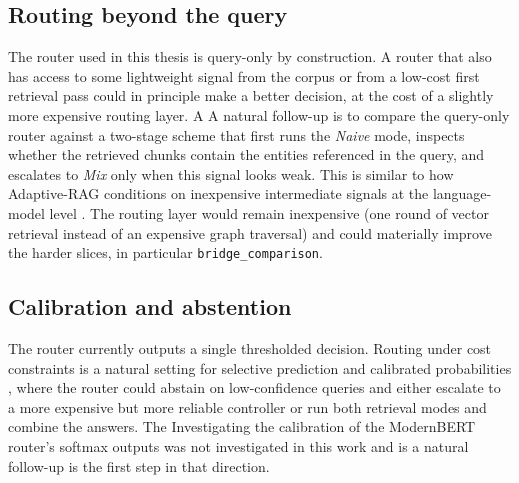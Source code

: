 \documentclass[english, bibtex]{kththesis}               %
\numberwithin{listing}{chapter}
\providecommand{\DIFaddtex}[1]{{\protect\color{blue} \sf #1}} %
\providecommand{\DIFdeltex}[1]{{\protect\color{red} \scriptsize #1}} %
\providecommand{\DIFaddbegin}{} %
\providecommand{\DIFaddend}{} %
\providecommand{\DIFdelbegin}{} %
\providecommand{\DIFdelend}{} %
\providecommand{\DIFadd}[1]{\texorpdfstring{\DIFaddtex{#1}}{#1}} %
\providecommand{\DIFdel}[1]{\texorpdfstring{\DIFdeltex{#1}}{}} %
\begin{document}
\subsection{Routing beyond the query} \DIFdelbegin %

\DIFdel{The router used in this thesis is query-only by construction. A router that also has access to some lightweight signal from the corpus or from a low-cost first retrieval pass could in principle make a better decision, at the cost of a slightly more expensive routing layer. A }\DIFdelend \DIFaddbegin \DIFadd{A }\DIFaddend natural follow-up is to compare the query-only router against a two-stage scheme that first runs the \emph{Naive} mode, inspects whether the retrieved chunks contain the entities referenced in the query, and escalates to \emph{Mix} only when this signal looks weak. This is similar to how Adaptive-RAG conditions on inexpensive intermediate signals at the language-model level \cite{jeong2024adaptiverag}. The routing layer would remain inexpensive (one round of vector retrieval instead of an expensive graph traversal) and could materially improve the harder slices, in particular \texttt{bridge\_comparison}.

\subsection{Calibration and abstention} \DIFdelbegin %

\DIFdel{The router currently outputs a single thresholded decision. }\DIFdelend Routing under cost constraints is a natural setting for selective prediction \cite{geifman2017selective} and calibrated probabilities \cite{guo2017calibration}, where the router could abstain on low-confidence queries and either escalate to a more expensive but more reliable controller or run both retrieval modes and combine the answers. \DIFdelbegin \DIFdel{The }\DIFdelend \DIFaddbegin \DIFadd{Investigating the }\DIFaddend calibration of the ModernBERT router's softmax outputs \DIFdelbegin \DIFdel{was not investigated in this work and is a natural follow-up}\DIFdelend \DIFaddbegin \DIFadd{is the first step in that direction}\DIFaddend .

\DIFdelbegin %
\end{document}
